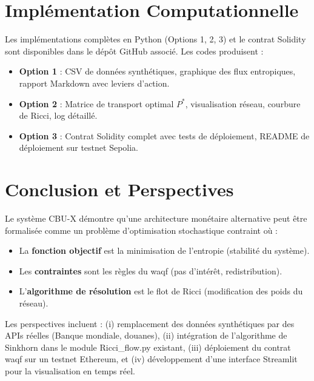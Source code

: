 \documentclass[11pt,a4paper]{article}
\theoremstyle{definition}
\theoremstyle{remark}
\begin{document}
\section{Implémentation Computationnelle}
\label{sec:implementation}

Les implémentations complètes en Python (Options 1, 2, 3) et le contrat Solidity sont disponibles dans le dépôt GitHub associé. Les codes produisent :

\begin{itemize}
    \item \textbf{Option 1} : CSV de données synthétiques, graphique des flux entropiques, rapport Markdown avec leviers d'action.
    \item \textbf{Option 2} : Matrice de transport optimal $P^*$, visualisation réseau, courbure de Ricci, log détaillé.
    \item \textbf{Option 3} : Contrat Solidity complet avec tests de déploiement, README de déploiement sur testnet Sepolia.
\end{itemize}

\section{Conclusion et Perspectives}
\label{sec:conclusion}

Le système CBU-X démontre qu'une architecture monétaire alternative peut être formalisée comme un problème d'optimisation stochastique contraint où :
\begin{itemize}
    \item La \textbf{fonction objectif} est la minimisation de l'entropie (stabilité du système).
    \item Les \textbf{contraintes} sont les règles du waqf (pas d'intérêt, redistribution).
    \item L'\textbf{algorithme de résolution} est le flot de Ricci (modification des poids du réseau).
\end{itemize}

Les perspectives incluent : (i) remplacement des données synthétiques par des APIs réelles (Banque mondiale, douanes), (ii) intégration de l'algorithme de Sinkhorn dans le module Ricci\_flow.py existant, (iii) déploiement du contrat waqf sur un testnet Ethereum, et (iv) développement d'une interface Streamlit pour la visualisation en temps réel.
\end{document}
